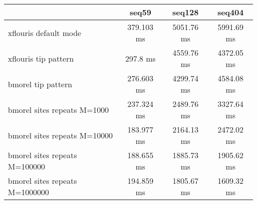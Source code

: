 \begin{tabular}{|l|c|c|c|}
\hline
 & seq59 & seq128 & seq404 \\
\hline
xflouris default mode & 379.103 ms & 5051.76 ms & 5991.69 ms\\
\hline
xflouris tip pattern & 297.8 ms & 4559.76 ms & 4372.05 ms\\
\hline
bmorel tip pattern & 276.603 ms & 4299.74 ms & 4584.08 ms\\
\hline
bmorel sites repeats M=1000 & 237.324 ms & 2489.76 ms & 3327.64 ms\\
\hline
bmorel sites repeats M=10000 & 183.977 ms & 2164.13 ms & 2472.02 ms\\
\hline
bmorel sites repeats M=100000 & 188.655 ms & 1885.73 ms & 1905.62 ms\\
\hline
bmorel sites repeats M=1000000 & 194.859 ms & 1805.67 ms & 1609.32 ms\\
\hline
\end{tabular}
